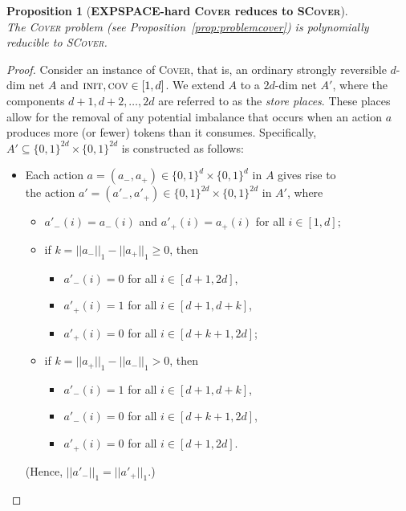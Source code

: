 \documentclass[11pt,a4paper]{amsart}
\newcommand{\Cover}{\textsc{Cover}\xspace}
\newcommand{\SCover}{\textsc{SCover}\xspace}
\newcommand{\normone}[1]{||#1||_1}
\newcommand{\pinit}{\textsc{init}}
\newcommand{\pcov}{\textsc{cov}}
\let\origtextsc\textsc
\renewcommand{\textsc}[1]{\textnormal{\origtextsc{#1}}}
\theoremstyle{plain}
\newtheorem{prop}[thm]{Proposition}
\theoremstyle{definition}
\theoremstyle{defC}
\theoremstyle{thmC}
\begin{document}
\begin{prop}[\textbf{EXPSPACE-hard \Cover reduces to \SCover}]
\hfill\\
	The \Cover problem (see Proposition~\ref{prop:problemcover}) is polynomially reducible to \SCover.
\end{prop}
\begin{proof}
Consider an instance of \Cover, that is,
an ordinary strongly reversible $d$-dim net $A$ and
$\pinit,\pcov\in[1,d]$.
We extend $A$ to a $2d$-dim net $A'$, where the components $d+1, d+2, \dots, 2d$ are referred to as the \emph{store places}. These places allow for the removal of any potential imbalance that occurs when an action $a$ produces more (or fewer) tokens than it consumes. Specifically, $A' \subseteq \{0,1\}^{2d} \times \{0,1\}^{2d}$ is constructed as follows:
	\begin{itemize}
	\item		
Each action $a=(a_-,a_+)\in\{0,1\}^d\times\{0,1\}^d$ in $A$ gives rise 
 to 
\\
the action $a'=(a'_-,a'_+)\in\{0,1\}^{2d}\times\{0,1\}^{2d}$ in $A'$,
where
		\begin{itemize}
			\item
				$a'_-(i)=a_-(i)$ and $a'_+(i)=a_+(i)$
				for all $i\in[1,d]$;
\item
if $k=\normone{a_-} - \normone{a_+}\geq 0$, then
\begin{itemize}
			 \item
				 $a'_-(i)=0$ for all
				 $i\in[d+1,2d]$,
	\item				$a'_+(i)=1$ for all
				 $i\in[d+1,d+k]$,
 \item
		$a'_+(i)=0$ for all
				 $i\in[d+k+1,2d]$;
\end{itemize}
\item
if $k=\normone{a_+} - \normone{a_-}>0$, then
				\begin{itemize}
\item
			$a'_-(i)=1$ for all $i\in[d+1,d+k]$, 
		\item		 $a'_-(i)=0$ for all
				 $i\in[d+k+1,2d]$,
\item
	$a'_+(i)=0$ for all $i\in[d+1,2d]$.
				\end{itemize}
				\end{itemize}
		(Hence, $\normone{a'_-}=\normone{a'_+}$.)
	

\end{itemize}
\end{proof}
\end{document}
